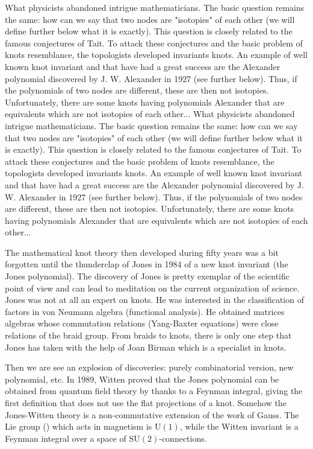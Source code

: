 {	What physicists abandoned intrigue mathematicians. The basic question remains the same: how can we say that two nodes are "isotopies" of each other (we will define further below what it is exactly). This question is closely related to the famous conjectures of Tait. To attack these conjectures and the basic problem of knots resemblance, the topologists developed invariants knots. An example of well known knot invariant and that have had  a great success are the Alexander polynomial discovered by J. W. Alexander in 1927 (see further below). Thus, if the polynomials of two nodes are different, these are then not isotopies. Unfortunately, there are some knots having polynomials Alexander that are equivalents which are not isotopies of each other...
	What physicists abandoned intrigue mathematicians. The basic question remains the same: how can we say that two nodes are "isotopies" of each other (we will define further below what it is exactly). This question is closely related to the famous conjectures of Tait. To attack these conjectures and the basic problem of knots resemblance, the topologists developed invariants knots. An example of well known knot invariant and that have had  a great success are the Alexander polynomial discovered by J. W. Alexander in 1927 (see further below). Thus, if the polynomials of two nodes are different, these are then not isotopies. Unfortunately, there are some knots having polynomials Alexander that are equivalents which are not isotopies of each other...
	
	The mathematical knot theory then developed during fifty years was a bit forgotten until the thunderclap of Jones in 1984 of a new knot invariant (the Jones polynomial). The discovery of Jones is pretty exemplar of the scientific point of view and can lead to meditation on the current organization of science. Jones was not at all an expert on knots. He was interested in the classification of factors in von Neumann algebra (functional analysis). He obtained matrices algebras whose commutation relations (Yang-Baxter equations) were close relations of the braid group. From braids to knots, there is only one step that Jones has taken with the help of Joan Birman which is a specialist in knots.
	
	Then we are see an explosion of discoveries: purely combinatorial version, new polynomial, etc. In 1989, Witten proved that the Jones polynomial can be obtained from quantum field theory by thanks to a Feynman integral, giving the first definition that does not use the flat projections of a knot. Somehow the Jones-Witten theory is a non-commutative extension of the work of Gauss. The Lie group () which acts in magnetism is $\text{U}(1)$, while the Witten invariant is a Feynman integral over a space of $\text{SU}(2)$-connections.
	
}
